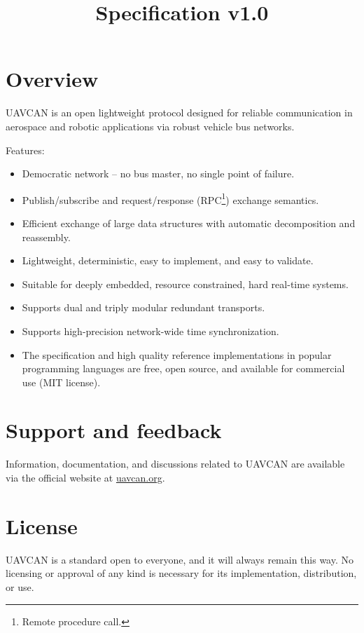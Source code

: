 \documentclass{uavcandoc}
\title{Specification v1.0}
\begin{document}
\frontmatter

\begin{titlepage}

\section*{Overview}

UAVCAN is an open lightweight protocol designed for reliable communication in aerospace and robotic applications via
robust vehicle bus networks.

Features:

\begin{itemize}
    \item Democratic network -- no bus master, no single point of failure.
    \item Publish/subscribe and request/response (RPC\footnote{Remote procedure call.}) exchange semantics.
    \item Efficient exchange of large data structures with automatic decomposition and reassembly.
    \item Lightweight, deterministic, easy to implement, and easy to validate.
    \item Suitable for deeply embedded, resource constrained, hard real-time systems.
    \item Supports dual and triply modular redundant transports.
    \item Supports high-precision network-wide time synchronization.
    \item The specification and high quality reference implementations in popular programming languages are free,
    open source, and available for commercial use (MIT license).
\end{itemize}

\BeginRightColumn

\section*{Support and feedback}

Information, documentation, and discussions related to UAVCAN are available via the official website at
\href{http://uavcan.org}{uavcan.org}.

\section*{License}

UAVCAN is a standard open to everyone, and it will always remain this way.
No licensing or approval of any kind is necessary for its implementation, distribution, or use.


\end{titlepage}
\end{document}

